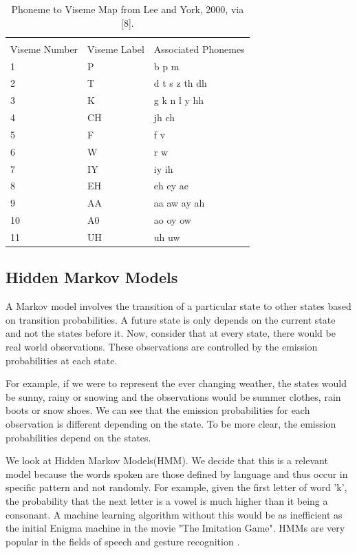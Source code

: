 \documentclass[a4paper,11pt]{article}
\begin{document}
\begin{table}[!ht]
\center
\caption{Phoneme to Viseme Map from Lee and York, 2000, via [8].}
\begin{tabular}{l l l}
\hline\hline\\
Viseme Number & Viseme Label & Associated Phonemes\\
 \hline
1   & P      &  b p m \\ 
2   & T      &  d t s z th dh\\
3   & K      &   g k n l y hh\\
4   & CH   &   jh ch\\
5   & F      &   f v\\
6   & W     &   r w\\
7   & IY     &   iy ih\\
8   & EH   &   eh ey ae\\
9   & AA    &   aa aw ay ah\\
10   & A0  &   ao oy ow\\
11 & UH   &   uh uw\\
\end{tabular}
\label{tab:pv}
\end{table}


\subsection{Hidden Markov Models}

A Markov model involves the transition of a particular state to other states based on transition probabilities. A future state is only depends on the current state and not the states before it. Now, consider that at every state, there would be real world observations. These observations are controlled by the emission probabilities at each state.

For example, if we were to represent the ever changing weather, the states would be sunny, rainy or snowing and the observations would be summer clothes, rain boots or snow shoes. We can see that the emission probabilities for each observation is different depending on the state. To be more clear, the emission probabilities depend on the states.

We look at Hidden Markov Models(HMM). We decide that this is a relevant model because the words spoken are those defined by language and thus occur in specific pattern and not randomly. For example, given the first letter of word 'k', the probability that the next letter is a vowel is much higher than it being a consonant. A machine learning algorithm without this would be as inefficient as the initial Enigma machine in the movie "The Imitation Game". HMMs are very popular in the fields of speech \cite{key-2} and gesture recognition \cite{key-4} \cite{key-5}.
\end{document}
